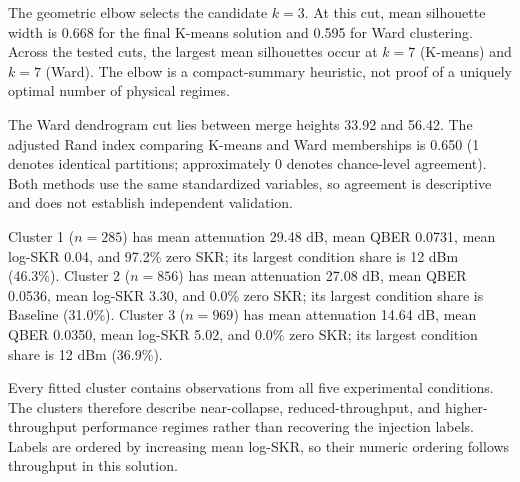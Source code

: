 The geometric elbow selects the candidate $k=3$. At this cut, mean silhouette width is 0.668 for the final K-means solution and 0.595 for Ward clustering. Across the tested cuts, the largest mean silhouettes occur at $k=7$ (K-means) and $k=7$ (Ward). The elbow is a compact-summary heuristic, not proof of a uniquely optimal number of physical regimes.

The Ward dendrogram cut lies between merge heights 33.92 and 56.42. The adjusted Rand index comparing K-means and Ward memberships is 0.650 (1 denotes identical partitions; approximately 0 denotes chance-level agreement). Both methods use the same standardized variables, so agreement is descriptive and does not establish independent validation.

Cluster 1 ($n=285$) has mean attenuation 29.48 dB, mean QBER 0.0731, mean log-SKR 0.04, and 97.2\% zero SKR; its largest condition share is 12 dBm (46.3\%). Cluster 2 ($n=856$) has mean attenuation 27.08 dB, mean QBER 0.0536, mean log-SKR 3.30, and 0.0\% zero SKR; its largest condition share is Baseline (31.0\%). Cluster 3 ($n=969$) has mean attenuation 14.64 dB, mean QBER 0.0350, mean log-SKR 5.02, and 0.0\% zero SKR; its largest condition share is 12 dBm (36.9\%).


Every fitted cluster contains observations from all five experimental conditions. The clusters therefore describe near-collapse, reduced-throughput, and higher-throughput performance regimes rather than recovering the injection labels. Labels are ordered by increasing mean log-SKR, so their numeric ordering follows throughput in this solution.
